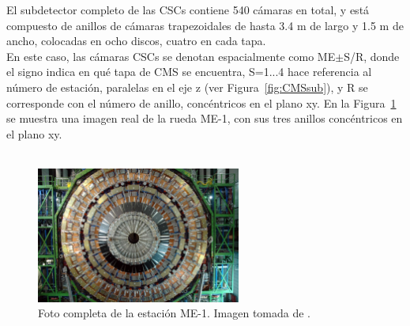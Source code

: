 El subdetector completo de las CSCs contiene 540 c\'amaras en total, y est\'a compuesto de anillos de c\'amaras trapezoidales de hasta 3.4 m de largo y 1.5 m de ancho, colocadas en ocho discos, cuatro en cada tapa. \\
En este caso, las c\'amaras CSCs se denotan espacialmente como ME$\pm$S/R, donde el signo indica en qu\'e tapa de CMS se encuentra, S=1...4 hace referencia al n\'umero de estaci\'on, paralelas en el eje z (ver Figura~\ref{fig:CMSsub}), y R se corresponde con el n\'umero de anillo, conc\'entricos en el plano xy. En la Figura~\ref{fig:CSC_MEm1} se muestra una imagen real de la rueda ME-1, con sus tres anillos conc\'entricos en el plano xy. \\ \\ 

\begin{figure}[h]
\centering
\includegraphics[width=0.60\textwidth]{figures/CSC_MEm1.jpg}
\caption{Foto completa de la estaci\'on ME-1. Imagen tomada de \cite{Breedon:1431505}.}
\label{fig:CSC_MEm1}        
\end{figure}


